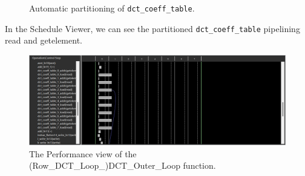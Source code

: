 \documentclass[a4paper,12pt,twoside]{article}
\begin{document}
\begin{enumerate}
\begin{figure}[H]
        \caption{Automatic partitioning of \texttt{dct\_coeff\_table}.}
    \end{figure}
    In the Schedule Viewer, we can see the partitioned \texttt{dct\_coeff\_table} pipelining read and getelement.
    \begin{figure}[H]
        \centering
        \includegraphics[width=\textwidth]{images/18.png}
        \caption{The Performance view of the (Row\_DCT\_Loop\_)DCT\_Outer\_Loop function.}
    \end{figure}
\end{enumerate}
\end{document}
